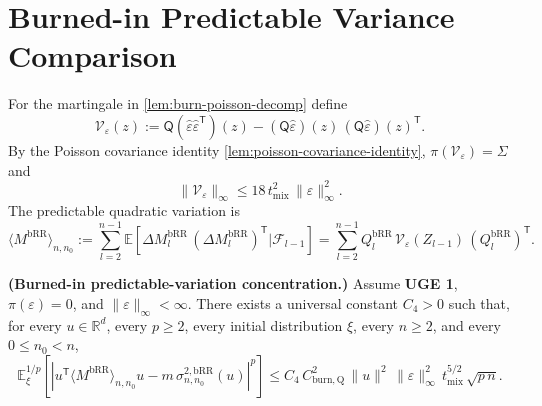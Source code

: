 
\section{Burned-in Predictable Variance Comparison}

For the martingale in \cref{lem:burn-poisson-decomp} define
\begin{equation}
\mathcal{V}_{\varepsilon}(z)
  := \mathsf{Q}(\hat{\varepsilon} \hat{\varepsilon}^{\mathsf{T}})(z)
   - (\mathsf{Q} \hat{\varepsilon})(z)
     \, (\mathsf{Q} \hat{\varepsilon})(z)^{\mathsf{T}}.
\label{eq:burn-bar-eps-def}
\end{equation}
By the Poisson covariance identity \cref{lem:poisson-covariance-identity},
$\pi(\mathcal{V}_{\varepsilon}) = \Sigma$ and
\begin{equation}
\lVert \mathcal{V}_{\varepsilon} \rVert_{\infty}
  \le 18 \, t_{\mathrm{mix}}^{2} \, \lVert \varepsilon \rVert_{\infty}^{2}.
\label{eq:burn-bar-eps-sup}
\end{equation}
The predictable quadratic variation is
\begin{equation}
\langle M^{\mathrm{bRR}} \rangle_{n,n_{0}}
  := \sum_{l = 2}^{n - 1}
      \mathbb{E}[\Delta M_{l}^{\mathrm{bRR}} \, (\Delta M_{l}^{\mathrm{bRR}})^{\mathsf{T}} | \mathcal{F}_{l - 1}]
  = \sum_{l = 2}^{n - 1}
      Q_{l}^{\mathrm{bRR}} \, \mathcal{V}_{\varepsilon}(Z_{l - 1}) \, (Q_{l}^{\mathrm{bRR}})^{\mathsf{T}}.
\label{eq:burn-bracket}
\end{equation}

\begin{lemma}\label{lem:burn-bracket-conc}
  \textbf{(Burned-in predictable-variation concentration.)}
  Assume \textbf{UGE 1}, $\pi(\varepsilon) = 0$, and
  $\lVert \varepsilon \rVert_{\infty} < \infty$. There exists a universal constant
  $C_{4} > 0$ such that, for every $u \in \mathbb{R}^{d}$, every $p \ge 2$, every initial
  distribution $\xi$, every $n \ge 2$, and every $0 \le n_{0} < n$,
  \begin{equation}
\mathbb{E}_{\xi}^{1 / p} \left[ | u^{\mathsf{T}} \langle M^{\mathrm{bRR}} \rangle_{n,n_{0}} u
      - m \, \sigma_{n,n_{0}}^{2, \mathrm{bRR}}(u) |^{p} \right]
    \le C_{4} \, C_{\mathrm{burn,Q}}^{2} \, \lVert u \rVert^{2}
       \, \lVert \varepsilon \rVert_{\infty}^{2} \, t_{\mathrm{mix}}^{5 / 2}
       \, \sqrt{p \, n}.
\label{eq:burn-bracket-conc}
\end{equation}
\end{lemma}

